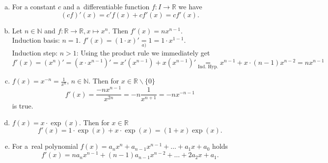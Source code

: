 \begin{example}
\begin{enumerate}[a)]
    \item For a constant $c$ and a~differentiable function $f:I\to\mathbb{R}$ we have
\[(cf)'(x)=c'f(x)+cf'(x)=cf'(x).\]
\item  Let $n\in\mathbb{N}$ and $f:\mathbb{R}\to\mathbb{R}, x\mapsto x^n$. Then $f'(x)=nx^{n-1}$.
\\ Induction basis: $n=1$. $f'(x)=(1\cdot x)'\underset{a)}{=}1=1\cdot x^{1-1}$. \\   
 Induction step: $n>1$: Using the product rule we immediately get
 $$f'(x)=(x^n)'=(x\cdot x^{n-1})' = x'(x^{n-1})+x(x^{n-1})'\underset{\text{Ind. Hyp.}}{=} x^{n-1}+x\cdot (n-1)x^{n-2}=nx^{n-1}$$
\item $f(x)=x^{-n}=\frac1{x^n}$, $n\in\mathbb{N}$. Then for $x\in\mathbb{R}\backslash\{0\}$
\[f'(x)=\frac{-nx^{n-1}}{x^{2n}}=-n\frac{1}{x^{n+1}}=-nx^{-n-1}\]
is true.
\item $f(x)=x\cdot \exp(x)$. Then for $x\in\mathbb{R}$
\[f'(x)=1\cdot\exp(x)+x\cdot\exp(x)=(1+x)\exp(x).\]
\item For a~real polynomial $f(x)=a_nx^n+a_{n-1}x^{n-1}+\ldots+a_1x+a_0$ holds
\[f'(x)=na_nx^{n-1}+(n-1)a_{n-1}x^{n-2}+\ldots+2a_2x+a_1.\]
\end{enumerate}
\end{example}

